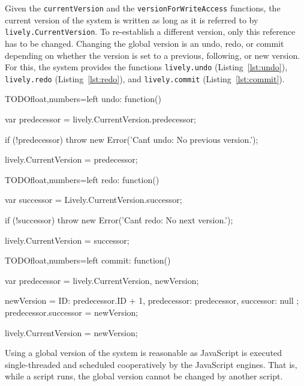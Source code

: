 Given the \lstinline{currentVersion} and the \lstinline{versionForWriteAccess} functions, the current version of the system is written as long as it is referred to by \lstinline{lively.CurrentVersion}.
To re-establish a different version, only this reference has to be changed.
Changing the global version is an undo, redo, or commit depending on whether the version is set to a previous, following, or new version.
For this, the system provides the functions \lstinline{lively.undo} (Listing~\ref{lst:undo}), \lstinline{lively.redo} (Listing~\ref{lst:redo}), and \lstinline{lively.commit} (Listing~\ref{lst:commit}).

\begin{code}{TODO}{float,numbers=left}
undo: function() {
    var predecessor = lively.CurrentVersion.predecessor;
    
    if (!predecessor) {
        throw new Error('Can\'t undo: No previous version.');
    }
    
    lively.CurrentVersion = predecessor;
}
\end{code}
\label{lst:undo}
\iffalse
\end{verbatim}\fi

\begin{code}{TODO}{float,numbers=left}
redo: function() {
    var successor = Lively.CurrentVersion.successor;
    
    if (!successor) {
        throw new Error('Can\'t redo: No next version.');
    }
    
    lively.CurrentVersion = successor;
}
\end{code}
\label{lst:redo}
\iffalse
\end{verbatim}\fi

\begin{code}{TODO}{float,numbers=left}
commit: function() {
    var predecessor = lively.CurrentVersion,
        newVersion;
    
    newVersion = {
        ID: predecessor.ID + 1,
        predecessor: predecessor,
        successor: null
    };
    predecessor.successor = newVersion;
    
    lively.CurrentVersion = newVersion;
}
\end{code}
\label{lst:commit}
\iffalse
\end{verbatim}\fi

Using a global version of the system is reasonable as JavaScript is executed single-threaded and scheduled cooperatively by the JavaScript engines.
That is, while a script runs, the global version cannot be changed by another script.

